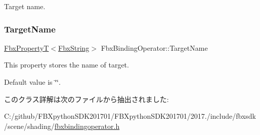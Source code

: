 Target name. 

\mbox{\label{class_fbx_binding_operator_a6c1e84a9019ff0fa80424439fa745ee1}} 
\subsubsection{\texorpdfstring{Target\+Name}{TargetName}}
{\footnotesize\ttfamily \hyperlink{class_fbx_property_t}{Fbx\+PropertyT}$<$\hyperlink{class_fbx_string}{Fbx\+String}$>$ Fbx\+Binding\+Operator\+::\+Target\+Name}

This property stores the name of target.

Default value is \char`\"{}\char`\"{}. 

このクラス詳解は次のファイルから抽出されました\+:\begin{DoxyCompactItemize}
\item 
C\+:/github/\+F\+B\+Xpython\+S\+D\+K201701/\+F\+B\+Xpython\+S\+D\+K201701/2017./include/fbxsdk/scene/shading/\hyperlink{fbxbindingoperator_8h}{fbxbindingoperator.\+h}\end{DoxyCompactItemize}
